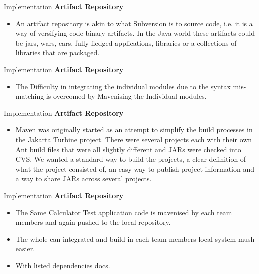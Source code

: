 \documentclass{beamer}
\begin{document}
\begin{frame}{Implementation}
	\textbf{Artifact Repository}
	\begin{itemize}
		\item An artifact repository is akin to what Subversion is to source code, i.e. it is a way of versifying code binary artifacts. In the Java world these artifacts could be jars, wars, ears, fully fledged applications, libraries or a collections of libraries that are packaged.
				
		
	\end{itemize}	
\end{frame}

\begin{frame}{Implementation}
	\textbf{Artifact Repository}
	\begin{itemize}
		\item The Difficulty in integrating the individual modules due to the syntax mis-matching is overcomed by 
	    Mavenising the Individual modules.
		
		
	\end{itemize}	
\end{frame}






\begin{frame}{Implementation}
	\textbf{Artifact Repository}
	\begin{itemize}
		
		
		
		
		\item Maven was originally started as an attempt to simplify the build processes in the Jakarta Turbine project. There were several projects each with their own Ant build files that were all slightly different and JARs were checked into CVS. We wanted a standard way to build the projects, a clear definition of what the project consisted of, an easy way to publish project information and a way to share JARs across several projects.
		
	\end{itemize}	
\end{frame}


\begin{frame}{Implementation}
	\textbf{Artifact Repository}
	\begin{itemize}
		
		\item The Same Calculator Test application code is mavenised by each team members and again pushed to the local repository.
		\vspace{0.05cm}
		\item The whole can integrated and build in each team members local system mush \underline{easier}. 
		\vspace{0.05cm}
		\item With listed dependencies docs.
	\end{itemize}	
\end{frame}
\end{document}

